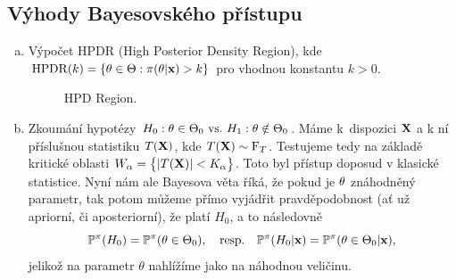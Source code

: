 	\subsection*{Výhody Bayesovského přístupu}
\begin{enumerate}[a)]
	\item Výpočet HPDR (High Posterior Density Region), kde $\mathrm{HPDR}(k)=\{\theta\in\Theta:\pi(\theta|\textbf{x})>k\}$ pro vhodnou konstantu $k>0$.

	\begin{figure}[h]
		\centering
		\caption{HPD Region.}
	\end{figure}
	
	\item Zkoumání hypotézy $H_0: \theta\in\Theta_0 ~\text{vs.}~ H_1: \theta\notin\Theta_0$. Máme k~dispozici $\textbf{X}$ a k ní příslušnou statistiku $T(\textbf{X})$, kde $T(\textbf{X})\sim\mathrm{F}_T$. Testujeme tedy na základě kritické oblasti $W_\alpha=\big\{ |T(\textbf{X})|<K_\alpha \big\}$. Toto byl přístup doposud v klasické statistice. Nyní nám ale Bayesova věta říká, že pokud je $\theta$ znáhodněný parametr, tak potom můžeme přímo vyjádřit pravděpodobnost (ať už apriorní, či aposteriorní), že platí $H_0$, a to následovně
	$$\mathbb{P}^\pi(H_0) = \mathbb{P}^\pi(\theta \in \Theta_0),\quad\text{resp.}\quad \mathbb{P}^\pi(H_0|\textbf{x})=\mathbb{P}^\pi(\theta\in\Theta_0|\textbf{x}),$$
	jelikož na parametr $\theta$ nahlížíme jako na náhodnou veličinu.

\end{enumerate}